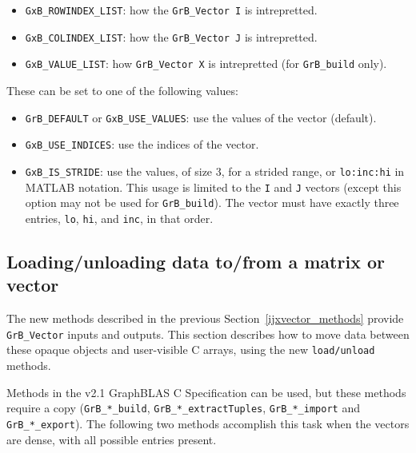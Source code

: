 \begin{itemize}
\item \verb'GxB_ROWINDEX_LIST': how the \verb'GrB_Vector I' is intrepretted.
\item \verb'GxB_COLINDEX_LIST': how the \verb'GrB_Vector J' is intrepretted.
\item \verb'GxB_VALUE_LIST': how \verb'GrB_Vector X' is intrepretted (for \verb'GrB_build' only).
\end{itemize}

These can be set to one of the following values:

\begin{itemize}
\item \verb'GrB_DEFAULT' or \verb'GxB_USE_VALUES': use the values of the vector (default).
\item \verb'GxB_USE_INDICES': use the indices of the vector.
\item \verb'GxB_IS_STRIDE': use the values, of size 3, for a strided range,
    or \verb'lo:inc:hi' in MATLAB notation.  This usage is limited to the
    \verb'I' and \verb'J' vectors (except this option may not be used for
    \verb'GrB_build').  The vector must have exactly three entries, 
    \verb'lo', \verb'hi', and \verb'inc', in that order.
\end{itemize}

\subsection{Loading/unloading data to/from a matrix or vector}
\label{container_v10}

The new methods described in the previous Section~\ref{ijxvector_methods}
provide \verb'GrB_Vector' inputs and outputs.  This section describes how to
move data between these opaque objects and user-visible C arrays, using
the new \verb'load/unload' methods.

Methods in the v2.1 GraphBLAS C Specification can be used, but these methods
require a copy (\verb'GrB_*_build', \verb'GrB_*_extractTuples',
\verb'GrB_*_import' and \verb'GrB_*_export').  The following two methods
accomplish this task when the vectors are dense, with all possible entries
present.

